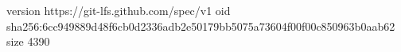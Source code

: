version https://git-lfs.github.com/spec/v1
oid sha256:6cc949889d48f6cb0d2336adb2e50179bb5075a73604f00f00c850963b0aab62
size 4390

